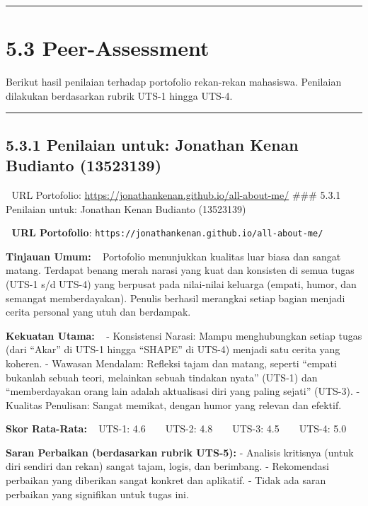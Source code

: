 \documentclass[
  letterpaper,
  DIV=11,
  numbers=noendperiod]{scrreprt}
\begin{document}
\begin{center}\rule{0.5\linewidth}{0.5pt}\end{center}

\section{5.3 Peer-Assessment}\label{peer-assessment}

Berikut hasil penilaian terhadap portofolio rekan-rekan mahasiswa.
Penilaian dilakukan berdasarkan rubrik UTS-1 hingga UTS-4.

\begin{center}\rule{0.5\linewidth}{0.5pt}\end{center}

\subsection{5.3.1 Penilaian untuk: Jonathan Kenan Budianto
(13523139)}\label{penilaian-untuk-jonathan-kenan-budianto-13523139}

🔗 URL Portofolio: \url{https://jonathankenan.github.io/all-about-me/}
\#\#\# 5.3.1 Penilaian untuk: Jonathan Kenan Budianto (13523139)

🔗 \textbf{URL Portofolio}:
\texttt{https://jonathankenan.github.io/all-about-me/}

\textbf{Tinjauan Umum:} ~ Portofolio menunjukkan kualitas luar biasa dan
sangat matang. Terdapat benang merah narasi yang kuat dan konsisten di
semua tugas (UTS-1 s/d UTS-4) yang berpusat pada nilai-nilai keluarga
(empati, humor, dan semangat memberdayakan). Penulis berhasil merangkai
setiap bagian menjadi cerita personal yang utuh dan berdampak.

\textbf{Kekuatan Utama:} ~ - Konsistensi Narasi: Mampu menghubungkan
setiap tugas (dari ``Akar'' di UTS-1 hingga ``SHAPE'' di UTS-4) menjadi
satu cerita yang koheren. - Wawasan Mendalam: Refleksi tajam dan matang,
seperti ``empati bukanlah sebuah teori, melainkan sebuah tindakan
nyata'' (UTS-1) dan ``memberdayakan orang lain adalah aktualisasi diri
yang paling sejati'' (UTS-3). - Kualitas Penulisan: Sangat memikat,
dengan humor yang relevan dan efektif.

\textbf{Skor Rata-Rata:} ~ UTS-1: 4.6 \textbar{} UTS-2:
4.8 \textbar{} UTS-3: 4.5 \textbar{} UTS-4: 5.0

\textbf{Saran Perbaikan (berdasarkan rubrik UTS-5):} - Analisis
kritisnya (untuk diri sendiri dan rekan) sangat tajam, logis, dan
berimbang. - Rekomendasi perbaikan yang diberikan sangat konkret dan
aplikatif. - Tidak ada saran perbaikan yang signifikan untuk tugas ini.
\end{document}
